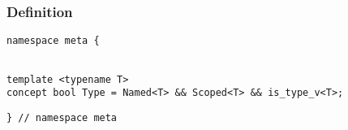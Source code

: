 
\subsubsection{Definition}

\begin{verbatim}
namespace meta {
\end{verbatim}
\begin{verbatim}

template <typename T>
concept bool Type = Named<T> && Scoped<T> && is_type_v<T>;

\end{verbatim}
\begin{verbatim}
} // namespace meta
\end{verbatim}
